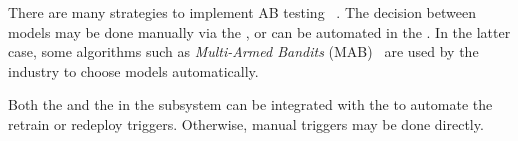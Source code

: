   There are many strategies to implement AB testing%
  ~\parencite{Kohavi2020TrustworthyExperiments}. The decision between
  models may be done manually via the ,
  or can be automated in the .
  In the latter case, some algorithms such as \emph{Multi-Armed Bandits}
  (MAB)~\parencite{Kohavi2020TrustworthyExperiments,RussellS2021Artificial4th}
  are used by the industry to choose models automatically.

  Both the  and the
   in the 
  subsystem can be integrated with the 
  to automate the retrain or redeploy triggers. Otherwise, manual triggers
  may be done directly.
